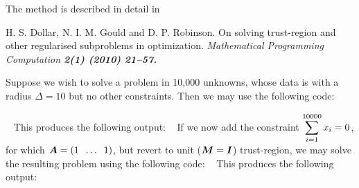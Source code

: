 \documentclass{galahad}
\begin{document}
\galreference
The method is described in detail in
\vspace*{1mm}

\noindent
H. S. Dollar, N. I. M. Gould and D. P. Robinson.
On solving trust-region and other regularised subproblems in optimization.
\em Mathematical Programming Computation \bf 2(1) \rm (2010) 21--57.


\galexample
Suppose we wish to solve a problem in 10,000 unknowns, whose data is
with a radius $\Delta = 10$ but no other constraints.
Then we may use the following code:

{\tt \small
\VerbatimInput{\packageexample}
}
\noindent
This produces the following output:
{\tt \small
\VerbatimInput{\packageresults}
}
If we now add the constraint $\displaystyle \sum_{i=1}^{10000} x_i = 0$,
for which ${\bm{A}} = ( 1 \;\; \ldots \;\; 1 )$, but revert to unit
(${\bm{M}} = {\bm{I}}$) trust-region, we may solve the
resulting problem using the following code:
{\tt \small
\VerbatimInput{\packageexampleb}
}
\noindent
This produces the following output:
{\tt \small
\VerbatimInput{\packageresultsb}
}
\end{document}
